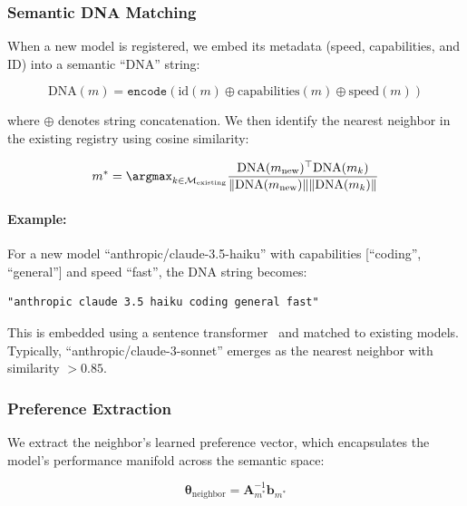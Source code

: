 \documentclass[sigconf]{acmart}
\begin{document}
\subsubsection{Semantic DNA Matching}

When a new model is registered, we embed its metadata (speed, capabilities, and ID) into a semantic ``DNA'' string:

\begin{equation}
\text{DNA}(m) = \texttt{encode}\left( \text{id}(m) \oplus \text{capabilities}(m) \oplus \text{speed}(m) \right)
\end{equation}

where $\oplus$ denotes string concatenation. We then identify the nearest neighbor in the existing registry using cosine similarity:

\begin{equation}
m^* = \argmax_{k \in \mathcal{M}_{\text{existing}}} \frac{\text{DNA}(m_{\text{new}})^\top \text{DNA}(m_k)}{\|\text{DNA}(m_{\text{new}})\| \|\text{DNA}(m_k)\|}
\label{eq:neighbor_selection}
\end{equation}

\paragraph{Example:} For a new model ``anthropic/claude-3.5-haiku'' with capabilities [``coding'', ``general''] and speed ``fast'', the DNA string becomes:
\begin{verbatim}
"anthropic claude 3.5 haiku coding general fast"
\end{verbatim}

This is embedded using a sentence transformer~\cite{reimers2019sentence} and matched to existing models. Typically, ``anthropic/claude-3-sonnet'' emerges as the nearest neighbor with similarity $> 0.85$.

\subsubsection{Preference Extraction}

We extract the neighbor's learned preference vector, which encapsulates the model's performance manifold across the semantic space:

\begin{equation}
\boldsymbol{\theta}_{\text{neighbor}} = \mathbf{A}_{m^*}^{-1} \mathbf{b}_{m^*}
\label{eq:preference_extraction}
\end{equation}
\end{document}
